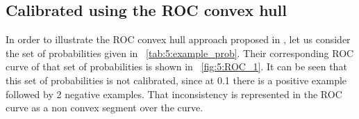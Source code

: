   
\subsection{Calibrated using the ROC convex hull}

In order to illustrate the ROC convex hull approach proposed in \citep{Hernandez-Orallo2012},
let us consider the set of probabilities given in \figurename{~\ref{tab:5:example_prob}}.
Their corresponding  ROC curve of that set of probabilities is shown in 
\figurename{~\ref{fig:5:ROC_1}}.  It can be seen that this set of probabilities is not calibrated, 
since at 0.1 there is a positive example  followed by 2 negative examples. That inconsistency is 
represented in the ROC curve as a non convex segment  over the curve.
  
